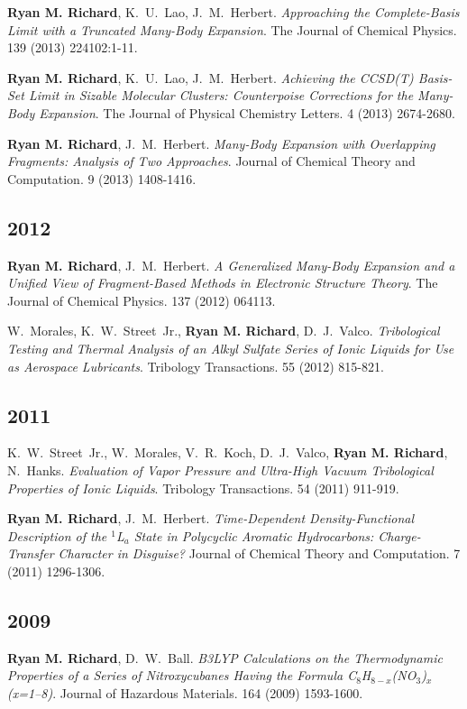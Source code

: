 \documentclass[11pt,a4paper,sans]{moderncv}
\begin{document}
\begin{etaremune}
	\item{\textbf{Ryan M. Richard}, K.~U.~Lao, J.~M.~Herbert.  {\em Approaching the Complete-Basis Limit with a Truncated Many-Body Expansion}.  The Journal of Chemical Physics.  139 (2013) 224102:1-11.}

	\item{\textbf{Ryan M. Richard}, K.~U.~Lao, J.~M.~Herbert.  {\em Achieving the CCSD(T) Basis-Set Limit in Sizable Molecular Clusters: Counterpoise Corrections for the Many-Body Expansion}.  The Journal of Physical Chemistry Letters.  4 (2013) 2674-2680.}

	\item{\textbf{Ryan M. Richard}, J.~M.~Herbert. {\em Many-Body Expansion with Overlapping Fragments: Analysis of Two Approaches}.  Journal of Chemical Theory and Computation.  9 (2013) 1408-1416.}

	\subsection{2012}

	\item{\textbf{Ryan M. Richard}, J.~M.~Herbert.  {\em A Generalized Many-Body Expansion and a Unified View of Fragment-Based Methods in Electronic Structure Theory}. The Journal of Chemical Physics. 137 (2012) 064113.}

	\item{W.~Morales, K.~W.~Street~Jr., \textbf{Ryan M. Richard}, D.~J.~Valco.  {\em Tribological Testing and Thermal Analysis of an Alkyl Sulfate Series of Ionic Liquids for Use as Aerospace Lubricants}.  Tribology Transactions.  55 (2012) 815-821.}
	\subsection{2011}

	\item{K.~W.~Street~Jr., W.~Morales, V.~R.~Koch, D.~J.~Valco, \textbf{Ryan M. Richard}, N.~Hanks.  {\em Evaluation of Vapor Pressure and Ultra-High Vacuum Tribological Properties of Ionic Liquids}.  Tribology Transactions.  54 (2011) 911-919.}

	\item{\textbf{Ryan M. Richard},  J.~M.~Herbert. {\em Time-Dependent Density-Functional Description of the $^1$L$_a$ State in Polycyclic Aromatic Hydrocarbons: Charge-Transfer Character in Disguise?} Journal of Chemical Theory and Computation. 7 (2011) 1296-1306. }
	\subsection{2009}
	\item{\textbf{Ryan M. Richard}, D.~W.~Ball. {\em B3LYP Calculations on the Thermodynamic Properties of a Series of Nitroxycubanes Having the Formula C$_8$H$_{8-x}$(NO$_3$)$_x$ (x=1--8)}.  Journal of Hazardous Materials.  164 (2009) 1593-1600.}


\end{etaremune}
\end{document}
